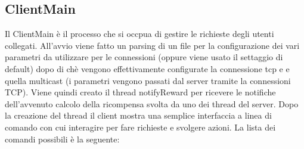 \documentclass[11pt, a4paper, oneside]{article}
\begin{document}
\subsection{ClientMain}
Il ClientMain è il processo che si occpua di gestire le richieste degli utenti collegati. All'avvio viene fatto un parsing di un file per la configurazione dei vari 
parametri da utilizzare per le connessioni (oppure viene usato il settaggio di default) dopo di chè vengono effettivamente configurate la connessione tcp e e quella 
multicast (i parametri vengono passati dal server tramite la connessioni TCP). Viene quindi creato il thread notifyReward per ricevere le notifiche dell'avvenuto
calcolo della ricompensa svolta da uno dei thread del server. Dopo la creazione del thread il client mostra una semplice interfaccia a linea di comando 
con cui interagire per fare richieste e svolgere azioni. La lista dei comandi possibili è la seguente:
\end{document}
